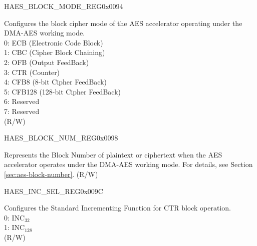 \begin{register}{H}{AES\_BLOCK\_MODE\_REG}{0x0094}\label{regdesc:AESBLOCKMODEREG}
%
%
\regnewline%
\begin{regdesc}\begin{reglist}
\label{fielddesc:AESBLOCKMODE}\item [AES\_BLOCK\_MODE] Configures the block cipher mode of the AES accelerator operating under the DMA-AES working mode. \\
0: ECB (Electronic Code Block)\\
1: CBC (Cipher Block Chaining)\\
2: OFB (Output FeedBack)\\
3: CTR (Counter)\\
4: CFB8 (8-bit Cipher FeedBack)\\
5: CFB128 (128-bit Cipher FeedBack)\\
6: Reserved\\
7: Reserved\\
(R/W)
\end{reglist}\end{regdesc}
\end{register}


\begin{register}{H}{AES\_BLOCK\_NUM\_REG}{0x0098}\label{regdesc:AESBLOCKNUMREG}
%
\regnewline%
\begin{regdesc}\begin{reglist}
\label{fielddesc:AESBLOCKNUM}\item [AES\_BLOCK\_NUM] Represents the Block Number of plaintext or ciphertext when the AES accelerator operates under the DMA-AES working mode. For details, see Section \ref{sec:aes-block-number}. (R/W)
\end{reglist}\end{regdesc}
\end{register}


\begin{register}{H}{AES\_INC\_SEL\_REG}{0x009C}\label{regdesc:AESINCSELREG}
%
%
\regnewline%
\begin{regdesc}\begin{reglist}
\label{fielddesc:AESINCSEL}\item [AES\_INC\_SEL] Configures the Standard Incrementing Function for CTR block operation. \\
0: INC$_{32}$\\
1: INC$_{128}$\\
(R/W)
\end{reglist}\end{regdesc}
\end{register}


